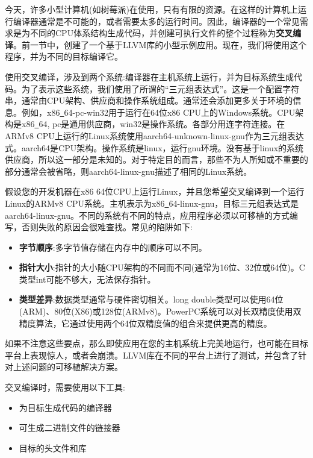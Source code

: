 
今天，许多小型计算机(如树莓派)在使用，只有有限的资源。在这样的计算机上运行编译器通常是不可能的，或者需要太多的运行时间。因此，编译器的一个常见需求是为不同的CPU体系结构生成代码，并创建可执行文件的整个过程称为\textbf{交叉编译}。前一节中，创建了一个基于LLVM库的小型示例应用。现在，我们将使用这个程序，并为不同的目标编译它。\par

使用交叉编译，涉及到两个系统:编译器在主机系统上运行，并为目标系统生成代码。为了表示这些系统，我们使用了所谓的“三元组表达式”。这是一个配置字符串，通常由CPU架构、供应商和操作系统组成。通常还会添加更多关于环境的信息。例如，x86\underline{~}64-pc-win32用于运行在64位x86 CPU上的Windows系统。CPU架构是x86\underline{~}64, pc是通用供应商，win32是操作系统。各部分用连字符连接。在ARMv8 CPU上运行的Linux系统使用aarch64-unknown-linux-gnu作为三元组表达式。aarch64是CPU架构。操作系统是linux，运行gnu环境。没有基于linux的系统供应商，所以这一部分是未知的。对于特定目的而言，那些不为人所知或不重要的部分通常会被省略，则aarch64-linux-gnu描述了相同的Linux系统。\par

假设您的开发机器在x86 64位CPU上运行Linux，并且您希望交叉编译到一个运行Linux的ARMv8 CPU系统。主机表示为x86\underline{~}64-linux-gnu，目标三元组表达式是aarch64-linux-gnu。不同的系统有不同的特点，应用程序必须以可移植的方式编写，否则失败的原因会很难查找。常见的陷阱如下:\par

\begin{itemize}
\item \textbf{字节顺序}:多字节值存储在内存中的顺序可以不同。
\item \textbf{指针大小}:指针的大小随CPU架构的不同而不同(通常为16位、32位或64位)。C类型int可能不够大，无法保存指针。
\item \textbf{类型差异}:数据类型通常与硬件密切相关。long double类型可以使用64位(ARM)、80位(X86)或128位(ARMv8)。PowerPC系统可以对长双精度使用双精度算法，它通过使用两个64位双精度值的组合来提供更高的精度。
\end{itemize}

如果不注意这些要点，那么即使应用在您的主机系统上完美地运行，也可能在目标平台上表现惊人，或者会崩溃。LLVM库在不同的平台上进行了测试，并包含了针对上述问题的可移植解决方案。\par

交叉编译时，需要使用以下工具:\par

\begin{itemize}
\item 为目标生成代码的编译器
\item 可生成二进制文件的链接器
\item 目标的头文件和库
\end{itemize}

